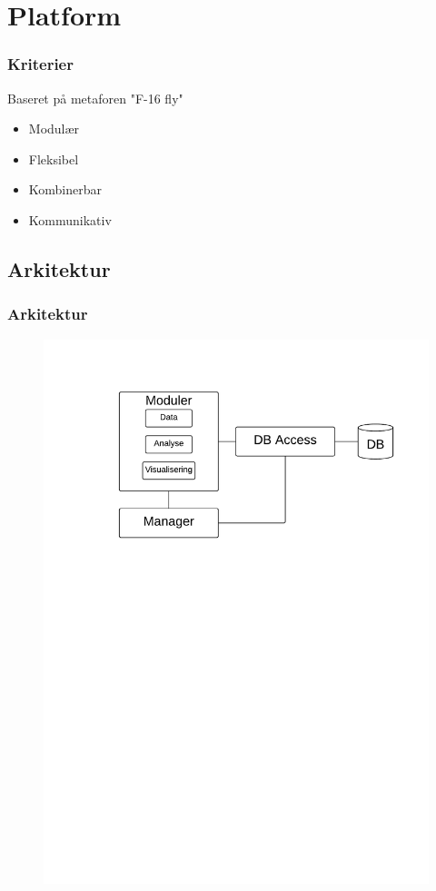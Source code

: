 \section{Platform}
\begin{frame}
\frametitle{Kriterier}
Baseret på metaforen "F-16 fly"
\begin{itemize}
\item Modulær
\item Fleksibel
\item Kombinerbar
\item Kommunikativ
\end{itemize}
\end{frame}

\subsection{Arkitektur}

\begin{frame}
\frametitle{Arkitektur}
\begin{figure}[h]
	\centering						%
	\includegraphics[scale=0.5, trim = 1cm 17.5cm 1cm 1cm, clip]{../grafik/ArkitekturLucidChart}
\end{figure}
\end{frame}


